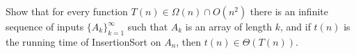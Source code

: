 \documentclass[11pt]{article}
\begin{document}
\begin{enumerate}
Show that for every function $T(n) \in \Omega(n) \cap O(n^2)$
there is an infinite sequence of inputs $\{A_k\}_{k=1}^{\infty}$
such that $A_k$ is an array of length $k$, and if $t(n)$ is the running time of
InsertionSort on $A_n$, then $t(n) \in \Theta(T(n))$.
\end{enumerate}
\end{document}
